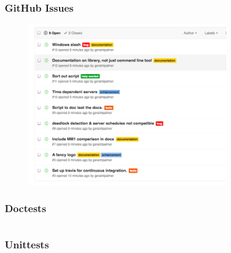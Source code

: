 \documentclass{beamer}
\begin{document}
\begin{frame}
\frametitle{GitHub Issues}
\begin{figure}
    \includegraphics[width=0.8\textwidth]{githubissues}
\end{figure}
\end{frame}

\begin{frame}
\begin{figure}
    
\end{figure}
\end{frame}

\begin{frame}
\frametitle{Doctests}
\inputminted{python}{doctests.py}
\end{frame}

\begin{frame}
\frametitle{Unittests}
\begin{center}
\fontsize{8.5pt}{10pt} \inputminted{python}{unittests.py}
\end{center}
\end{frame}
\end{document}
